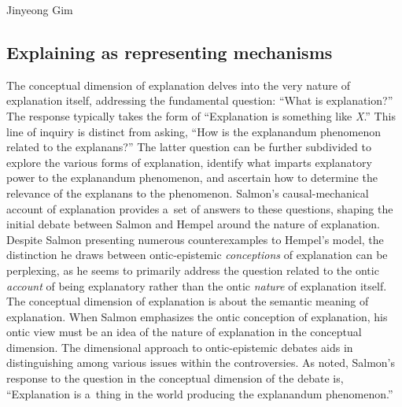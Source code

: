 \begin{artengenv}{Jinyeong Gim}
\subsection{Explaining as representing mechanisms}

The conceptual dimension of explanation delves into the very nature of explanation itself, addressing the fundamental question: ``What is explanation?'' The response typically takes the form of ``Explanation is something like \textit{X}.'' This line of inquiry is distinct from asking, ``How is the explanandum phenomenon related to the explanans?'' The latter question can be further subdivided to explore the various forms of explanation, identify what imparts explanatory power to the explanandum phenomenon, and ascertain how to determine the relevance of the explanans to the phenomenon. Salmon's causal-mechanical account of explanation provides a~set of answers to these questions, shaping the initial debate between Salmon and Hempel around the nature of explanation. Despite Salmon presenting numerous counterexamples to Hempel's model, the distinction he draws between ontic-epistemic \textit{conceptions} of explanation can be perplexing, as he seems to primarily address the question related to the ontic \textit{account} of being explanatory rather than the ontic \textit{nature} of explanation itself. The conceptual dimension of explanation is about the semantic meaning of explanation. When Salmon emphasizes the ontic conception of explanation, his ontic view must be an idea of the nature of explanation in the conceptual dimension. The dimensional approach to ontic-epistemic debates aids in distinguishing among various issues within the controversies. As noted, Salmon's response to the question in the conceptual dimension of the debate is, ``Explanation is a~thing in the world producing the explanandum phenomenon.''


\end{artengenv}
